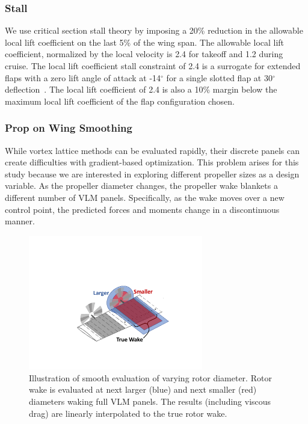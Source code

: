 \documentclass[conf]{new-aiaa}
\begin{document}
\subsubsection{Stall}

We use critical section stall theory by imposing a 20\% reduction in the allowable local lift coefficient on the last 5\% of the wing span. The allowable local lift coefficient, normalized by the local velocity is 2.4 for takeoff and 1.2 during cruise. The local lift coefficient stall constraint of 2.4 is a surrogate for extended flaps with a zero lift angle of attack at -14$^\circ$ for a single slotted flap at 30$^\circ$ deflection~\cite{Abbott:2012aa}. The local lift coefficient of 2.4 is also a 10\% margin below the maximum local lift coefficient of the flap configuration chosen.


\subsubsection{Prop on Wing Smoothing}

While vortex lattice methods can be evaluated rapidly, their discrete panels can create difficulties with gradient-based optimization. This problem arises for this study because we are interested in exploring different propeller sizes as a design variable. As the propeller diameter changes, the propeller wake blankets a different number of VLM panels. Specifically, as the wake moves over a new control point, the predicted forces and moments change in a discontinuous manner.


\begin{figure}[htbp]
    \centering
    \includegraphics[trim={7.75cm 4.25cm 5.4cm 7.75cm},clip,width=3.0in]{wake-smooth4}
    \caption{Illustration of smooth evaluation of varying rotor diameter. Rotor wake is evaluated at next larger (blue) and next smaller (red) diameters waking full VLM panels. The results (including viscous drag) are linearly interpolated to the true rotor wake.}
    \label{fig:wake-smooth}
\end{figure}
\end{document}
